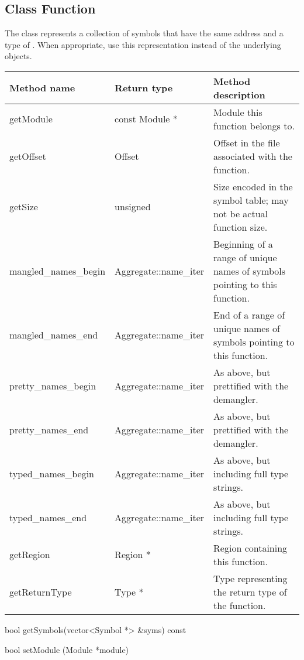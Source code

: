 \subsection{Class Function}\label{Function}
The  class represents a collection of symbols that have the same address
and a type of . When appropriate, use this representation instead of the underlying  objects. 

\begin{tabular}{p{1.25in}p{1.125in}p{3.125in}}
\toprule
Method name & Return type & Method description \\
\midrule
getModule & const Module * & Module this function belongs to. \\
getOffset & Offset & Offset in the file associated with the function. \\
getSize & unsigned & Size encoded in the symbol table; may not be actual function size. \\
mangled_names_begin & Aggregate::name_iter & Beginning of a range of unique names of symbols pointing to this function. \\
mangled_names_end & Aggregate::name_iter & End of a range of unique names of symbols pointing to this function. \\
pretty_names_begin &  Aggregate::name_iter & As above, but prettified with the demangler. \\
pretty_names_end &  Aggregate::name_iter & As above, but prettified with the demangler. \\
typed_names_begin & Aggregate::name_iter  & As above, but including full type strings. \\
typed_names_end & Aggregate::name_iter  & As above, but including full type strings. \\
getRegion & Region * & Region containing this function. \\
getReturnType & Type * & Type representing the return type of the function. \\
\bottomrule
\end{tabular}
	
\begin{apient}
bool getSymbols(vector<Symbol *> &syms) const
\end{apient}

\begin{apient}
bool setModule (Module *module)
\end{apient}

